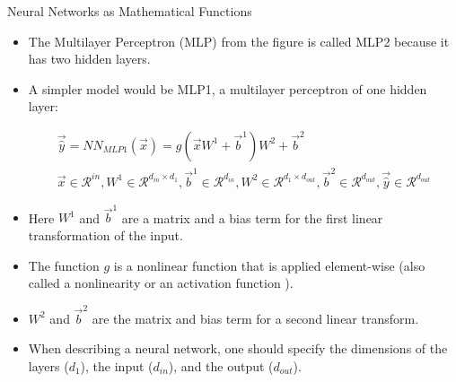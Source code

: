 \documentclass[handout]{beamer}
\begin{document}
\begin{frame}{Neural Networks as Mathematical Functions}
\begin{scriptsize}
\begin{itemize}
\item The Multilayer Perceptron (MLP) from the figure is called MLP2 because it has two hidden layers.
\item A simpler model would be MLP1, a multilayer perceptron of one hidden layer:
\begin{center}
\begin{equation}
\begin{split}
\vec{\hat{y}} = NN_{MLP1}(\vec{x}) = g(\vec{x}W^{1}+\vec{b}^{1})W^{2}+\vec{b}^{2} \\
\vec{x} \in \mathcal{R}^{in}, W^{1} \in \mathcal{R}^{d_{in}\times d_{1}}, \vec{b}^{1} \in \mathcal{R}^{d_{in}}, W^{2} \in \mathcal{R}^{d_{1}\times d_{out}}, \vec{b}^{2} \in \mathcal{R}^{d_{out}}, \vec{\hat{y}} \in \mathcal{R}^{d_{out}}    
\end{split}
\end{equation}
\end{center}

\item Here $W^{1}$ and $\vec{b}^{1}$ are a matrix and a bias term for the first linear transformation of the input.
\item The function $g$ is a nonlinear function that is applied element-wise (also called a nonlinearity or an activation function ).
\item $W^{2}$ and $\vec{b}^{2}$ are the matrix and bias term for a second linear transform.

\item When describing a neural network, one should specify the dimensions of the layers ($d_{1}$), the input ($d_{in}$), and the output ($d_{out}$).
\end{itemize}


\end{scriptsize}
\end{frame}
\end{document}
